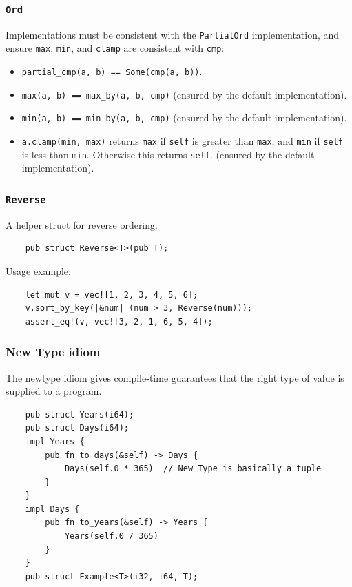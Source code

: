 \documentclass[aspectratio=1610,t]{beamer}
\begin{document}
\begin{frame}[fragile]
\frametitle{\texttt{Ord}}
Implementations must be consistent with the \texttt{PartialOrd} implementation, and ensure \texttt{max}, \texttt{min}, and \texttt{clamp} are consistent with \texttt{cmp}:

\begin{itemize}
    \item \texttt{partial\_cmp(a, b) == Some(cmp(a, b))}.
    \item \texttt{max(a, b) == max\_by(a, b, cmp)} (ensured by the default implementation).
    \item \texttt{min(a, b) == min\_by(a, b, cmp)} (ensured by the default implementation).
    \item \texttt{a.clamp(min, max)} returns \texttt{max} if \texttt{self} is greater than \texttt{max}, and \texttt{min} if \texttt{self} is less than \texttt{min}. Otherwise this returns \texttt{self}. (ensured by the default implementation).
\end{itemize}
\end{frame}


\begin{frame}[fragile]
\frametitle{\texttt{Reverse}}
A helper struct for reverse ordering.

\begin{verbatim}
    pub struct Reverse<T>(pub T);
\end{verbatim}

Usage example:

\begin{verbatim}
    let mut v = vec![1, 2, 3, 4, 5, 6];
    v.sort_by_key(|&num| (num > 3, Reverse(num)));
    assert_eq!(v, vec![3, 2, 1, 6, 5, 4]);
\end{verbatim}
\end{frame}


\begin{frame}[fragile]
\frametitle{New Type idiom}
The newtype idiom gives compile-time guarantees that the right type of value is supplied to a program.

\begin{verbatim}
    pub struct Years(i64);
    pub struct Days(i64);
    impl Years {
        pub fn to_days(&self) -> Days {
            Days(self.0 * 365)  // New Type is basically a tuple
        }
    }
    impl Days {
        pub fn to_years(&self) -> Years {
            Years(self.0 / 365)
        }
    }
    pub struct Example<T>(i32, i64, T);
\end{verbatim}
\end{frame}
\end{document}
